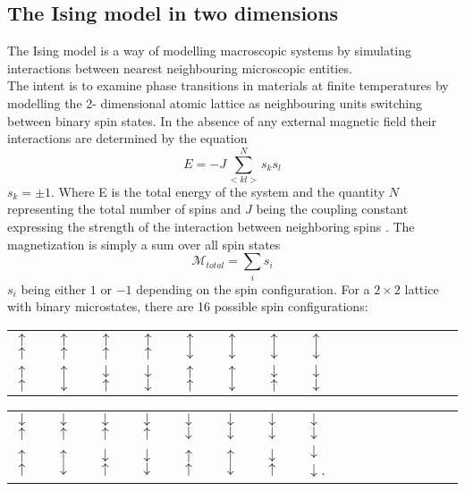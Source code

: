 \documentclass[10pt,a4paper]{article}
\begin{document}
\subsection{The Ising model in two dimensions}
The Ising model is a way of modelling macroscopic systems by simulating interactions between nearest neighbouring microscopic entities.\\The intent is to examine phase transitions in materials at finite temperatures by modelling the 2- dimensional atomic lattice as neighbouring units switching between  binary spin states. In the absence of any external magnetic field their interactions are determined by the equation
\begin{equation} \label{2d-ising energy}
E=-J\sum_{< kl >}^{N}s_ks_l 
\end{equation}
$s_k=\pm 1$. Where E is the total energy of the system and the quantity $N$ representing the total number of spins and $J$ being the coupling constant expressing the strength of the interaction between
neighboring spins \cite{Lecture_Notes_Fall_2015}. The magnetization is simply a sum over all spin states
\begin{equation}
\mathcal{M}_{total} = \sum_{i} s_i
\end{equation}
$s_i$ being either $1$ or $-1$ depending on the spin configuration.
For a $2\times2$ lattice with binary microstates, there are 16 possible spin configurations:
\begin{table}[H]
\begin{tabular}{llllllllllllllll}
 $\uparrow$ $\uparrow$ &  $\uparrow$ $\uparrow$ &  $\uparrow$ $\uparrow$ &  $\uparrow$ $\uparrow$ &  $\uparrow$ $\downarrow$ &  $\uparrow$ $\downarrow$ & $\uparrow$ $\downarrow$ & $\uparrow$ $\downarrow$ \\
 $\uparrow$ $\uparrow$&  $\uparrow$ $\downarrow$ &  $\downarrow$ $\uparrow$ &  $\downarrow$ $\downarrow$ &  $\uparrow$ $\uparrow$ &  $\uparrow$ $\downarrow$ &  $\downarrow$ $\uparrow$ &  $\downarrow$ $\downarrow$
\end{tabular}
\end{table}
\begin{table}[H]
\begin{tabular}{llllllllllllllll}
 $\downarrow$ $\uparrow$ & $\downarrow$ $\uparrow$ & $\downarrow$ $\uparrow$ & $\downarrow$ $\uparrow$ & $\downarrow$ $\downarrow$ & $\downarrow$ $\downarrow$ &  $\downarrow$ $\downarrow$ & $\downarrow$ $\downarrow$ \\
 $\uparrow$ $\uparrow$ & $\uparrow$ $\downarrow$ & $\downarrow$ $\uparrow$ & $\downarrow$ $\downarrow$ & $\uparrow$ $\uparrow$ & $\uparrow$ $\downarrow$ & $\downarrow$ $\uparrow$ & $\downarrow$ $\downarrow$.
\end{tabular}
\end{table}
\end{document}
